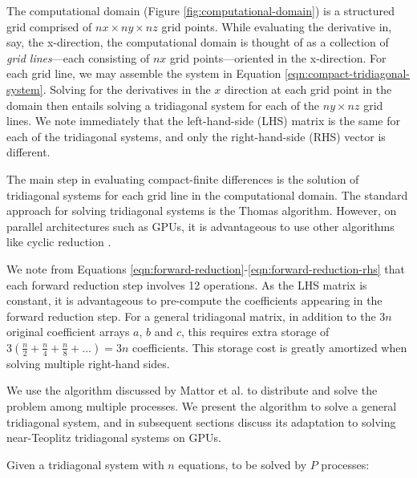 \documentclass{elsarticle}
\begin{document}
The computational domain (Figure \ref{fig:computational-domain})
is a structured grid comprised of $nx \times ny \times nz$ grid points.
While evaluating the derivative in, say, the x-direction,
the computational domain is thought of as
a collection of \emph{grid lines}---each consisting of
$nx$ grid points---oriented in the x-direction.
For each grid line, we may assemble the system in
Equation \ref{eqn:compact-tridiagonal-system}.
Solving for the derivatives in the $x$ direction
at each grid point in the domain then entails
solving a tridiagonal system for each of the $ny \times nz$ grid lines.
We note immediately that the left-hand-side (LHS) matrix
is the same for each of the tridiagonal systems,
and only the right-hand-side (RHS) vector is different.


The main step in evaluating compact-finite differences is the
solution of tridiagonal systems
for each grid line in the computational domain.
The standard approach for solving tridiagonal systems is
the Thomas algorithm.
However, on parallel architectures such as GPUs,
it is advantageous to use other algorithms like
cyclic reduction \cite{Zhang2010FTS}.




We note from
Equations \ref{eqn:forward-reduction}-\ref{eqn:forward-reduction-rhs}
that each forward reduction step involves 12 operations.
As the LHS matrix is constant,
it is advantageous to pre-compute the coefficients appearing
in the forward reduction step.
For a general tridiagonal matrix,
in addition to the $3n$ original coefficient arrays
$a$, $b$ and $c$,
this requires extra storage of 
$3(\frac{n}{2}+\frac{n}{4}+\frac{n}{8}+...)=3n$
coefficients.
This storage cost is greatly amortized
when solving multiple right-hand sides.

We use the algorithm discussed by Mattor et al.
\cite{mattor1995algorithm}
to distribute and solve the problem among multiple processes. 
We present the algorithm to solve a general tridiagonal system,
and in subsequent sections discuss its adaptation to solving
near-Teoplitz tridiagonal systems on GPUs.

Given a tridiagonal system with  $n$ equations,
to be solved by $P$ processes:
\end{document}
